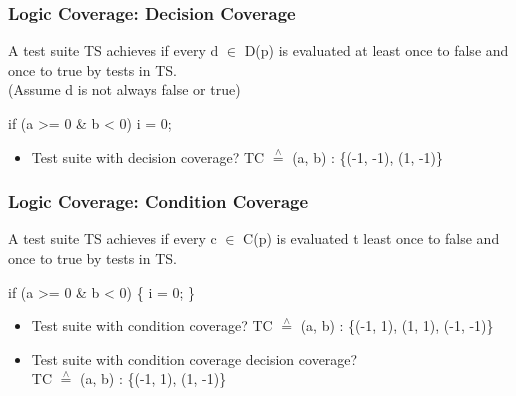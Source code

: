\subsubsection*{Logic Coverage: Decision Coverage}
  
\begin{defBox}[title=Definition (Decision Coverage)]
    A test suite TS achieves  if every d $\in$ D(p) is evaluated at least once to false and once to true by tests in TS.\\
    (Assume d is not always false or true)
\end{defBox}
\begin{defBox}[title=Example]
    if (a >= 0 \& b < 0){ i = 0; }
    \begin{itemize}
        \item Test suite with decision coverage? TC $\overset{\wedge}{=}$ (a, b) : \{(-1, -1), (1, -1)\}
    \end{itemize}
\end{defBox}
\subsubsection*{Logic Coverage: Condition Coverage}
  
\begin{defBox}[title=Definition(Condition Coverage)]
    A test suite TS achieves  if every c $\in$ C(p) is evaluated t least once to false and once to true by tests in TS.
\end{defBox}
\begin{defBox}[title=Example]
    if (a >= 0 \& b < 0) \{ i = 0; \}
    \begin{itemize}
        \item Test suite with condition coverage? TC $\overset{\wedge}{=}$ (a, b) : \{(-1, 1), (1, 1), (-1, -1)\}
        \item Test suite with condition coverage  decision coverage?\\
        TC $\overset{\wedge}{=}$ (a, b) : \{(-1, 1), (1, -1)\}
    \end{itemize}
\end{defBox}
